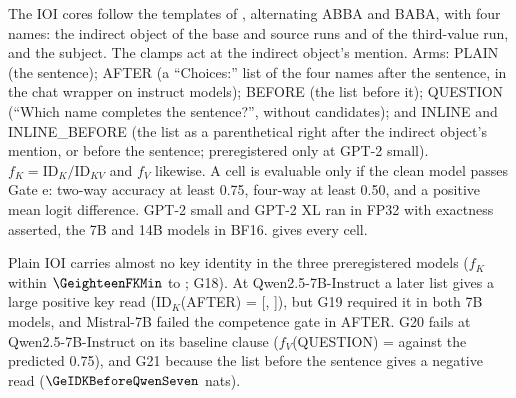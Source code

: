 The IOI cores follow the templates of \citet{wang2022ioi}, alternating ABBA and BABA, with four names: the indirect object of the base and source runs and of the third-value run, and the subject. The clamps act at the indirect object's mention. Arms: PLAIN (the sentence); AFTER (a ``Choices:'' list of the four names after the sentence, in the chat wrapper on instruct models); BEFORE (the list before it); QUESTION (``Which name completes the sentence?'', without candidates); and INLINE and INLINE\_BEFORE (the list as a parenthetical right after the indirect object's mention, or before the sentence; preregistered only at GPT-2 small). $f_K = \mathrm{ID}_K/\mathrm{ID}_{KV}$ and $f_V$ likewise. A cell is evaluable only if the clean model passes Gate e: two-way accuracy at least 0.75, four-way at least 0.50, and a positive mean logit difference. GPT-2 small and GPT-2 XL ran in FP32 with exactness asserted, the 7B and 14B models in BF16.  gives every cell.

\begin{table}[!ht]
\centering
\caption{\textbf{IOI} (preregistration G, part (e); 200 fresh cores). Gate e: two-way / four-way accuracy of the clean run (failed cells are not evaluable). $\mathrm{ID}_K$ with 95\% bootstrap CI, $\mathrm{ID}_V$ and $\mathrm{ID}_{KV}$ in nats; $f_K$, $f_V$: shares of $\mathrm{ID}_{KV}$, unstable where $\mathrm{ID}_{KV}$ is near zero. GPT-2 small, Qwen2.5-7B-Instruct and Mistral-7B enter G18--G22 (the GPT-2 small parts replicate a disclosed pilot); Qwen2.5-7B base, Qwen2.5-14B-Instruct and GPT-2 XL are exploratory.}
\label{tab:ioi}
\resizebox{\textwidth}{!}{}
\end{table}

Plain IOI carries almost no key identity in the three preregistered models ($f_K$ within $\GeighteenFKMin$ to \GeighteenFKMax{}; G18). At Qwen2.5-7B-Instruct a later list gives a large positive key read ($\mathrm{ID}_K$(AFTER) = \GeIDKAfterQwenSeven{} [\GeIDKAfterQwenSevenLo{}, \GeIDKAfterQwenSevenHi{}]), but G19 required it in both 7B models, and Mistral-7B failed the competence gate in AFTER. G20 fails at Qwen2.5-7B-Instruct on its baseline clause ($f_V$(QUESTION) = \GeFVQuestionQwenSeven{} against the predicted 0.75), and G21 because the list before the sentence gives a negative read ($\GeIDKBeforeQwenSeven$ nats).

